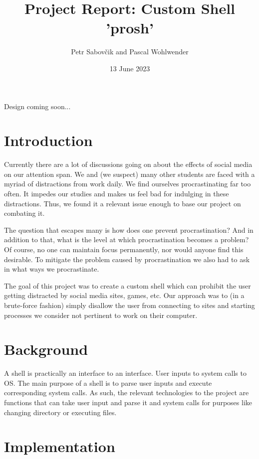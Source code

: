 \documentclass{article}
\title{Project Report: Custom Shell 'prosh'}
\date{13 June 2023}
\author{Petr Sabovčik and Pascal Wohlwender}
\begin{document}
\begin{titlepage}
	\maketitle
	Design coming soon...
\end{titlepage}

\tableofcontents
\pagebreak

\section{Introduction}

Currently there are a lot of discussions going on about the effects of social media on our attention span. We and (we suspect) many other students are faced with a myriad of distractions from work daily. We find ourselves procrastinating far too often. It impedes our studies and makes us feel bad for indulging in these distractions. Thus, we found it a relevant issue enough to base our project on combating it. 

The question that escapes many is how does one prevent procrastination? And in addition to that, what is the level at which procrastination becomes a problem? Of course, no one can maintain focus permanently, nor would anyone find this desirable. To mitigate the problem caused by procrastination we also had to ask in what ways we procrastinate. 

The goal of this project was to create a custom shell which can prohibit the user getting distracted by social media sites, games, etc. Our approach was to (in a brute-force fashion) simply disallow the user from connecting to sites and starting processes we consider not pertinent to work on their computer. 

\section{Background}

A shell is practically an interface to an interface. User inputs to system calls to OS. The main purpose of a shell is to parse user inputs and execute corresponding system calls. As such, the relevant technologies to the project are functions that can take user input and parse it and system calls for purposes like changing directory or executing files.

\section{Implementation}
\end{document}
